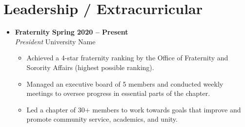 \documentclass[letterpaper,5pt]{article}
\newcommand{\smalltextbullet}{\,\begin{picture}(-1,1)(-1,-3)\circle*{3}\end{picture}\ }
\begin{document}
    \section{\textbf{Leadership / Extracurricular}}
    \begin{itemize}
        \item[]
            \textbf{Fraternity} \hfill \textbf{Spring 2020 -- Present} \\
            \textit{President} \hfill University Name
            \begin{itemize}
                \vspace*{-2mm}
                \item[\smalltextbullet] Achieved a 4-star fraternity ranking by the Office of Fraternity and Sorority Affairs (highest possible ranking).
                \item[\smalltextbullet] Managed an executive board of 5 members and conducted weekly meetings to oversee progress in essential parts of the chapter.
                \item[\smalltextbullet] Led a chapter of 30+ members to work towards goals that improve and promote community service, academics, and unity.
            \end{itemize}
    \end{itemize}
    
\end{document}
